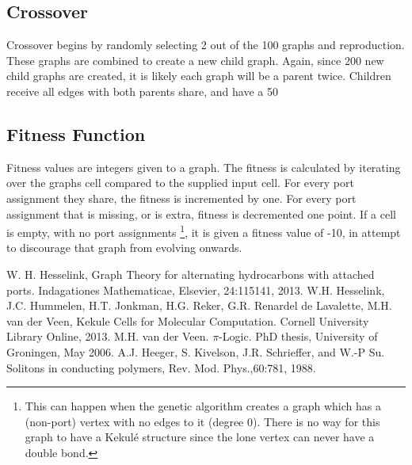 \documentclass[12pt]{article}
\begin{document}
\subsection{Crossover}
Crossover begins by randomly selecting 2 out of the 100 graphs and reproduction. These graphs are combined to create a new child graph. Again, since 200 new child graphs are created, it is likely each graph will be a parent twice. Children receive all edges with both parents share, and have a 50%

\subsection{Fitness Function}

Fitness values are integers given to a graph. The fitness is calculated by iterating over the graphs cell compared to the supplied input cell. For every port assignment they share, the fitness is incremented by one. For every port assignment that is missing, or is extra, fitness is decremented one point. If a cell is empty, with no port assignments \footnote{This can happen when the genetic algorithm creates a graph which has a (non-port) vertex with no edges to it (degree 0). There is no way for this graph to have a Kekul\'e structure since the lone vertex can never have a double bond.}, it is given a fitness value of -10, in attempt to discourage that graph from evolving onwards. 



\begin{thebibliography}{abrv}

 W. H. Hesselink, Graph Theory for alternating hydrocarbons with attached ports. Indagationes Mathematicae, Elsevier, 24:115141, 2013.
 W.H. Hesselink, J.C. Hummelen, H.T. Jonkman, H.G. Reker, G.R. Renardel de Lavalette, M.H. van der Veen, Kekule Cells for Molecular Computation. Cornell University Library Online, 2013.
 M.H. van der Veen. $\pi$-Logic. PhD thesis, University of Groningen, May 2006.
 A.J. Heeger, S. Kivelson, J.R. Schrieffer, and W.-P Su. Solitons in conducting polymers, Rev. Mod. Phys.,60:781, 1988.

\end{thebibliography}
\end{document}
